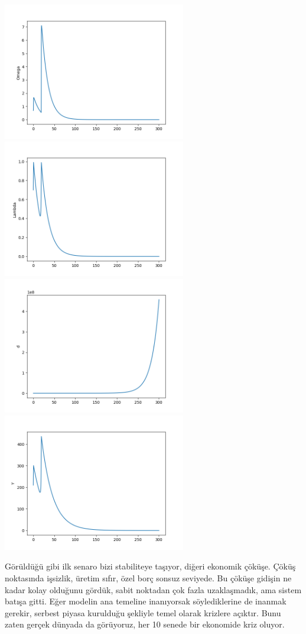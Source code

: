 \documentclass[12pt,fleqn]{article}\usepackage{../../common}
\begin{document}
\includegraphics[height=6cm]{chaos_app03_05.png}
\includegraphics[height=6cm]{chaos_app03_06.png}
\includegraphics[height=6cm]{chaos_app03_07.png}
\includegraphics[height=6cm]{chaos_app03_08.png}

Görüldüğü gibi ilk senaro bizi stabiliteye taşıyor, diğeri ekonomik
çöküşe. Çöküş noktasında işsizlik, üretim sıfır, özel borç sonsuz
seviyede. Bu çöküşe gidişin ne kadar kolay olduğunu gördük, sabit noktadan
çok fazla uzaklaşmadık, ama sistem batışa gitti. Eğer modelin ana temeline
inanıyorsak söylediklerine de inanmak gerekir, serbest piyasa kurulduğu
şekliyle temel olarak krizlere açıktır. Bunu zaten gerçek dünyada da
görüyoruz, her 10 senede bir ekonomide kriz oluyor.
\end{document}
